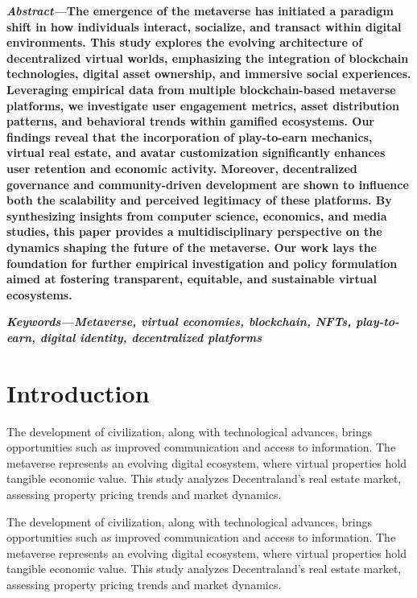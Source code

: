 \documentclass[a4paper]{article}
\begin{document}
\begin{multicols}{2}
\setlength{\columnsep}{0.5cm}


\noindent \textbf{\textit{Abstract---}The emergence of the metaverse has initiated a paradigm shift in how individuals interact, socialize, and transact within digital environments. This study explores the evolving architecture of decentralized virtual worlds, emphasizing the integration of blockchain technologies, digital asset ownership, and immersive social experiences. Leveraging empirical data from multiple blockchain-based metaverse platforms, we investigate user engagement metrics, asset distribution patterns, and behavioral trends within gamified ecosystems. Our findings reveal that the incorporation of play-to-earn mechanics, virtual real estate, and avatar customization significantly enhances user retention and economic activity. Moreover, decentralized governance and community-driven development are shown to influence both the scalability and perceived legitimacy of these platforms. By synthesizing insights from computer science, economics, and media studies, this paper provides a multidisciplinary perspective on the dynamics shaping the future of the metaverse. Our work lays the foundation for further empirical investigation and policy formulation aimed at fostering transparent, equitable, and sustainable virtual ecosystems.
}

\small	
\noindent \textbf{\textit{Keywords---}\textit{Metaverse, virtual economies, blockchain, NFTs, play-to-earn, digital identity, decentralized platforms}}

\section{Introduction}
The development of civilization, along with technological advances, brings opportunities such as improved communication and access to information. The metaverse represents an evolving digital ecosystem, where virtual properties hold tangible economic value. This study analyzes Decentraland’s real estate market, assessing property pricing trends and market dynamics.

The development of civilization, along with technological advances, brings opportunities such as improved communication and access to information. The metaverse represents an evolving digital ecosystem, where virtual properties hold tangible economic value. This study analyzes Decentraland’s real estate market, assessing property pricing trends and market dynamics.


\end{multicols}
\end{document}
